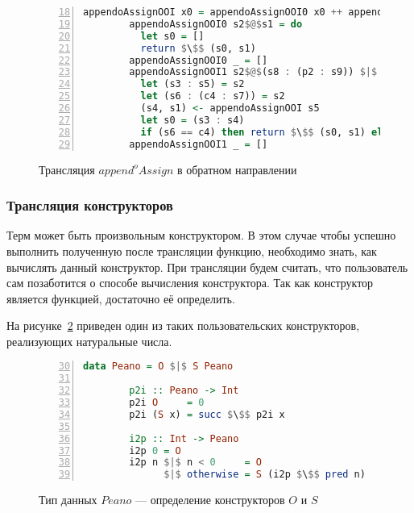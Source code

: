 \begin{figure}[h!]
  \begin{center}
  \begin{minipage}{1\textwidth}
  \begin{lstlisting}[language=Haskell, frame=single, numbers=left,numberstyle=\small, firstnumber=18, escapechar=|]
        appendoAssignOOI x0 = appendoAssignOOI0 x0 ++ appendoAssignOOI1 x0
        appendoAssignOOI0 s2$@$s1 = do
          let s0 = []
          return $\$$ (s0, s1)
        appendoAssignOOI0 _ = []
        appendoAssignOOI1 s2$@$(s8 : (p2 : s9)) $|$ s8 == p2 = do
          let (s3 : s5) = s2
          let (s6 : (c4 : s7)) = s2                 |\label{line:appendoAssignOOITR8}|
          (s4, s1) <- appendoAssignOOI s5
          let s0 = (s3 : s4)
          if (s6 == c4) then return $\$$ (s0, s1) else [] |\label{line:appendoAssignOOITR8}|
        appendoAssignOOI1 _ = []
    \end{lstlisting}
  \end{minipage}
  \end{center}
  \caption{Трансляция $append^oAssign$ в обратном направлении}
  \label{lst:appendoAssignOOITR}
\end{figure}


\subsubsection{Трансляция конструкторов}

Терм \miniKanren{} может быть произвольным конструктором.
В этом случае чтобы успешно выполнить полученную после трансляции функцию, необходимо знать, как вычислять данный конструктор.
При трансляции будем считать, что пользователь сам позаботится о способе вычисления конструктора.
Так как конструктор является функцией, достаточно её определить.

На рисунке~\ref{lst:peano} приведен один из таких пользовательских конструкторов, реализующих натуральные числа.

\begin{figure}[h!]
  \begin{center}
  \begin{minipage}{0.7\textwidth}
  \begin{lstlisting}[language=Haskell, frame=single, numbers=left,numberstyle=\small, firstnumber=30, escapechar=|]
        data Peano = O $|$ S Peano
        
        p2i :: Peano -> Int
        p2i O     = 0
        p2i (S x) = succ $\$$ p2i x
        
        i2p :: Int -> Peano
        i2p 0 = O
        i2p n $|$ n < 0     = O
              $|$ otherwise = S (i2p $\$$ pred n)
    \end{lstlisting}
  \end{minipage}
  \end{center}
  \caption{Тип данных $Peano$ --- определение конструкторов $O$ и $S$}
  \label{lst:peano}
\end{figure}
